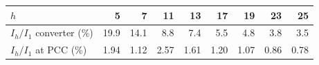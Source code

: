 \begin{tabular}{lrrrrrrrr}
\toprule
$h$ & 5 & 7 & 11 & 13 & 17 & 19 & 23 & 25\\
\midrule
$I_h/I_1$ converter (\%) & 19.9 & 14.1 & 8.8 & 7.4 & 5.5 & 4.8 & 3.8 & 3.5\\
$I_h/I_1$ at PCC (\%) & 1.94 & 1.12 & 2.57 & 1.61 & 1.20 & 1.07 & 0.86 & 0.78\\
\bottomrule
\end{tabular}
